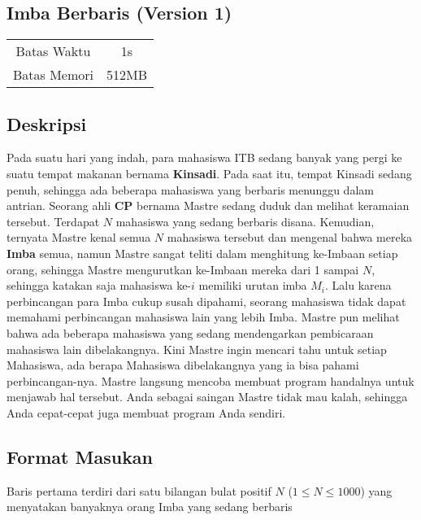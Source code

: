 \documentclass{article}
\begin{document}
\begin{center}
    \section*{Imba Berbaris (Version 1)} %

    \begin{tabular}{ | c c | }
        \hline
        Batas Waktu  & 1s \\    %
        Batas Memori & 512MB \\  %
        \hline
    \end{tabular}
\end{center}

\subsection*{Deskripsi}

Pada suatu hari yang indah, para mahasiswa ITB sedang banyak yang pergi ke suatu tempat makanan bernama \textbf{Kinsadi}. Pada saat itu, tempat Kinsadi sedang penuh, sehingga ada beberapa mahasiswa yang berbaris menunggu dalam antrian. Seorang ahli \textbf{CP} bernama Mastre sedang duduk dan melihat keramaian tersebut. Terdapat $N$ mahasiswa yang sedang berbaris disana. Kemudian, ternyata Mastre kenal semua $N$ mahasiswa tersebut dan mengenal bahwa mereka \textbf{Imba} semua, namun Mastre sangat teliti dalam menghitung ke-Imbaan setiap orang, sehingga Mastre mengurutkan ke-Imbaan mereka dari 1 sampai $N$, sehingga katakan saja mahasiswa ke-$i$ memiliki urutan imba $M_i$. Lalu karena perbincangan para Imba cukup susah dipahami, seorang mahasiswa tidak dapat memahami perbincangan mahasiswa lain yang lebih Imba. Mastre pun melihat bahwa ada beberapa mahasiswa yang sedang mendengarkan pembicaraan mahasiswa lain dibelakangnya. Kini Mastre ingin mencari tahu untuk setiap Mahasiswa, ada berapa Mahasiswa dibelakangnya yang ia bisa pahami perbincangan-nya. Mastre langsung mencoba membuat program handalnya untuk menjawab hal tersebut. Anda sebagai saingan Mastre tidak mau kalah, sehingga Anda cepat-cepat juga membuat program Anda sendiri.



\subsection*{Format Masukan}

Baris pertama terdiri dari satu bilangan bulat positif $N$ ($1 \leq N \leq 1000$) yang menyatakan banyaknya orang Imba yang sedang berbaris
\end{document}
